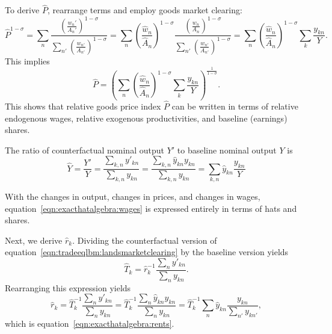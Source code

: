 \documentclass[11pt]{article}
\theoremstyle{definition}
\begin{document}
To derive $\hat{P}$,
rearrange terms and employ goods market clearing:
\begin{equation*}
	\hat{P}^{1-\sigma} 
	=
	\sum_n \frac{\left( \frac{w_n'}{A_n'} \right)^{1-\sigma}}{\sum_{n'} \left( \frac{w_{n'}}{A_{n'}} \right)^{1-\sigma}}
	=
	\sum_n \left( \frac{\hat{w}_n}{\hat{A}_n} \right)^{1-\sigma} \frac{\left( \frac{w_n}{A_n} \right)^{1-\sigma}}{\sum_{n'} \left( \frac{w_{n'}}{A_{n'}} \right)^{1-\sigma}}
	=
	\sum_n \left( \frac{\hat{w}_n}{\hat{A}_n} \right)^{1-\sigma} \sum_k \frac{y_{kn}}{Y}
.\end{equation*}
This implies
\begin{equation*}
	\hat{P} = \left( \sum_n \left( \frac{\hat{w}_n}{\hat{A}_n} \right)^{1-\sigma} \sum_k \frac{y_{kn}}{Y} \right)^{\frac{1}{1-\sigma}}.
\end{equation*}
This shows that relative goods price index $\hat{P}$ can be written in terms of relative endogenous wages, relative exogenous productivities, and baseline (earnings) shares.

The ratio of counterfactual nominal output $Y'$ to baseline nominal output $Y$ is
\begin{equation*}
	\hat{Y}
	=
	\frac{Y'}{Y}
	=
	\frac{\sum_{k,n} y'_{kn}}{ \sum_{k,n} y_{kn}}
	=
	\frac{\sum_{k,n} \hat{y}_{kn} y_{kn}}{\sum_{k,n} y_{kn}}
	=
	\sum_{k,n} \hat{y}_{kn} \frac{y_{kn}}{Y}
\end{equation*}

With the changes in output, changes in prices, and changes in wages,
equation~\eqref{eqn:exacthatalgebra:wages} is expressed entirely in terms of hats and shares.

Next, we derive $\hat{r}_k$.
Dividing the counterfactual version of equation~\eqref{eqn:tradeeqlbm:landsmarketclearing} by the baseline version yields
\begin{equation*} \label{eqn:hat_rent_expression}
\hat{T}_k = \hat{r}_k^{-1} \frac{\sum_n y'_{kn}}{\sum_n y_{kn}}
.\end{equation*}
Rearranging this expression yields
\begin{equation*}
\hat{r}_k = \hat{T}_k^{-1} \frac{\sum_n y'_{kn}}{\sum_n y_{kn}} = \hat{T}_k^{-1} \frac{\sum_n \hat{y}_{kn} y_{kn}}{\sum_n y_{kn}} = \hat{T}_{k}^{-1} \sum_{n} \hat{y}_{kn} \frac{y_{kn}}{\sum_{n'} y_{kn'}} \nonumber
,\end{equation*}
which is equation~\eqref{eqn:exacthatalgebra:rents}. 
\end{document}
